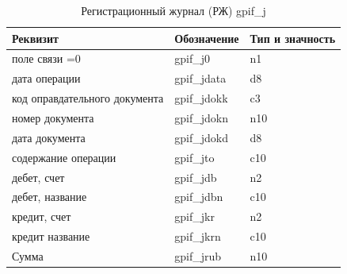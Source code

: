 \begin{table}[h!p]
    \centering
    \scriptsize
    \caption{Регистрационный журнал (РЖ) gpif\_j}
    \begin{tabular}{|l|l|l|} 

                                                                                       \hline
\textbf{Реквизит}               &\textbf{Обозначение}   &\textbf{Тип и значность}   \\ \hline
поле связи	=0                  &gpif\_j0               &n1                         \\ \hline
дата операции                   &gpif\_jdata            &d8                         \\ \hline
код оправдательного документа   &gpif\_jdokk            &c3                         \\ \hline
номер документа                 &gpif\_jdokn            &n10                        \\ \hline
дата документа                  &gpif\_jdokd            &d8                         \\ \hline
содержание операции             &gpif\_jto              &c10                        \\ \hline
дебет, счет                     &gpif\_jdb              &n2                         \\ \hline
дебет, название                 &gpif\_jdbn             &c10                        \\ \hline
кредит, счет                    &gpif\_jkr              &n2                         \\ \hline
кредит название                 &gpif\_jkrn             &c10                        \\ \hline
Сумма                           &gpif\_jrub             &n10                        \\ \hline

    \end{tabular}
\end{table}

